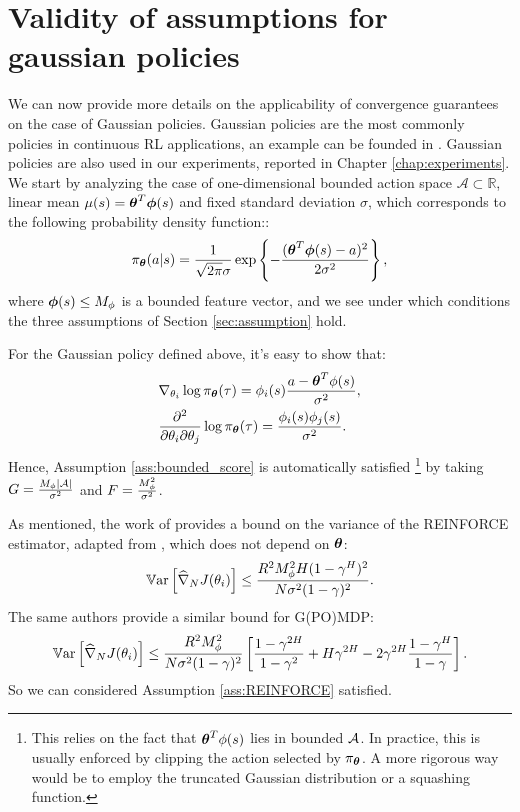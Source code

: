 \section{Validity of assumptions for gaussian policies}\label{sec:gaussianassumption}
We can now provide more details on the applicability of convergence guarantees on the case of Gaussian policies. Gaussian policies are the most commonly policies in continuous RL applications, an example can be founded in \cite{kober2013reinforcement}. Gaussian policies are also used in our experiments, reported in Chapter \ref{chap:experiments}. We start by analyzing the case of one-dimensional bounded action space $\mathcal{A}\subset\mathbb{R}$, linear mean $\mu(s) = \vtheta^T\vphi(s)$ and fixed standard deviation $\sigma$, which corresponds to the following probability density function::
\[
\pi_{\vtheta}(a\vert s) = \frac{1}{\sqrt{2\pi}\sigma}\exp\left\{
-\frac{(\vtheta^T\vphi(s) - a)^2}{2\sigma^2}\right\},
\]
where $\vphi(s)\leq M_{\phi}$ is a bounded feature vector, and we see under which conditions the three assumptions of Section \ref{sec:assumption} hold.

For the Gaussian policy defined above, it's easy to show that:
\begin{align*}
&\nabla_{\theta_i}\log\pi_{\vtheta}(\tau) =  \phi_i(s)\frac{a-\vtheta^T\phi(s)}{\sigma^2},\\
&\frac{\partial^2}{\partial\theta_i\partial\theta_j}\log\pi_{\vtheta}(\tau) = \frac{\phi_i(s)\phi_j(s)}{\sigma^2}.
\end{align*}
Hence, Assumption \ref{ass:bounded_score} is automatically satisfied \footnote{This relies on the fact that $\vtheta^T\phi(s)$ lies in bounded $\Aspace$. In practice, this is usually enforced by clipping the action selected by $\pi_{\vtheta}$. A more rigorous way would be to employ the truncated Gaussian distribution or a squashing function.} by taking $\GRADLOG = \frac{M_{\phi}|\Aspace|}{\sigma^2}$ and $\HESSLOG = \frac{M_{\phi}^2}{\sigma^2}$.
\par

As mentioned, the work of \cite{pirotta2013adaptive} provides a bound on the variance of the REINFORCE estimator, adapted from \cite{zhao2011analysis}, which does not depend on $\vtheta$:
\begin{align*}
\Var\left[\gradApp{\theta_i}{N}\right] \leq \frac{R^2M_{\phi}^2H(1-\gamma^H)^2}{N\sigma^2(1-\gamma)^2}.
\end{align*}
The same authors provide a similar bound for G(PO)MDP:
\begin{align*}
\Var\left[\gradApp{\theta_i}{N}\right] \leq \frac{R^2M_{\phi}^2}{N\sigma^2(1-\gamma)^2}\left[
 \frac{1-\gamma^{2H}}{1-\gamma^2} + H\gamma^{2H} - 2\gamma^{2H}\frac{1-\gamma^{H}}{1-\gamma} \right].
\end{align*}
 So we can considered Assumption \ref{ass:REINFORCE} satisfied.


